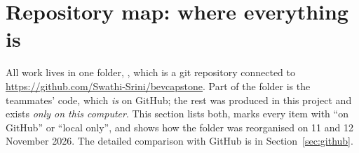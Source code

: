 \section{Repository map: where everything is}\label{sec:repomap}

\begin{plainwords}
All work lives in one folder, , which is a git repository connected to \url{https://github.com/Swathi-Srini/bevcapstone}. Part of the folder is the teammates' code, which \emph{is} on GitHub; the rest was produced in this project and exists \emph{only on this computer}. This section lists both, marks every item with ``on GitHub'' or ``local only'', and shows how the folder was reorganised on 11 and 12 November 2026. The detailed comparison with GitHub is in Section~\ref{sec:github}.
\end{plainwords}

